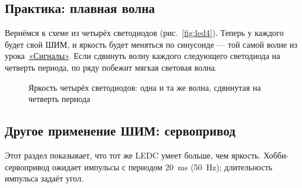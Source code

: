 \subsection{Практика: плавная волна}

Вернёмся к схеме из четырёх светодиодов (рис.~\ref{fig:led4}). Теперь у каждого будет свой ШИМ, и яркость
будет меняться по синусоиде --- той самой волне из урока~\hyperref[les:signals]{«Сигналы»}. Если сдвинуть волну каждого
следующего светодиода на четверть периода, по ряду побежит мягкая световая волна.

\begin{figure}[H]
\centering
{}
\caption{Яркость четырёх светодиодов: одна и та же волна, сдвинутая на четверть периода}
\end{figure}



\subsection{Другое применение ШИМ: сервопривод}

Этот раздел показывает, что тот же LEDC умеет больше, чем яркость.
Хобби-сервопривод ожидает импульсы с периодом \SI{20}{ms} (\SI{50}{Hz}); длительность импульса задаёт угол.

